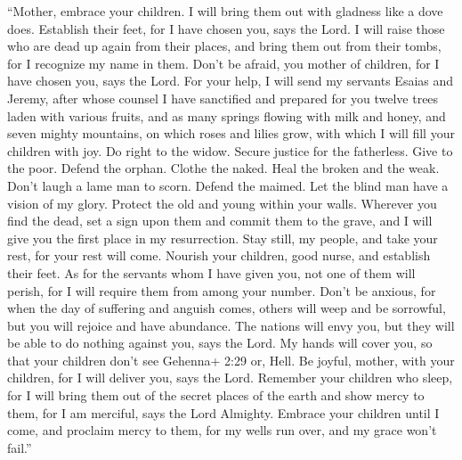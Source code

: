  ``Mother, embrace your children. I will bring them out
with gladness like a dove does. Establish their feet, for I have chosen
you, says the Lord.  I will raise those who are dead up
again from their places, and bring them out from their tombs, for I
recognize my name in them.  Don't be afraid, you mother of
children, for I have chosen you, says the Lord.  For your
help, I will send my servants Esaias and Jeremy, after whose counsel I
have sanctified and prepared for you twelve trees laden with various
fruits,  and as many springs flowing with milk and honey,
and seven mighty mountains, on which roses and lilies grow, with which I
will fill your children with joy.  Do right to the widow.
Secure justice for the fatherless. Give to the poor. Defend the orphan.
Clothe the naked.  Heal the broken and the weak. Don't
laugh a lame man to scorn. Defend the maimed. Let the blind man have a
vision of my glory.  Protect the old and young within your
walls.  Wherever you find the dead, set a sign upon them
and commit them to the grave, and I will give you the first place in my
resurrection.  Stay still, my people, and take your rest,
for your rest will come.  Nourish your children, good
nurse, and establish their feet.  As for the servants whom
I have given you, not one of them will perish, for I will require them
from among your number.  Don't be anxious, for when the day
of suffering and anguish comes, others will weep and be sorrowful, but
you will rejoice and have abundance.  The nations will envy
you, but they will be able to do nothing against you, says the Lord.
 My hands will cover you, so that your children don't see
Gehenna+ 2:29 or, Hell.  Be joyful, mother, with your
children, for I will deliver you, says the Lord.  Remember
your children who sleep, for I will bring them out of the secret places
of the earth and show mercy to them, for I am merciful, says the Lord
Almighty.  Embrace your children until I come, and proclaim
mercy to them, for my wells run over, and my grace won't fail.''

